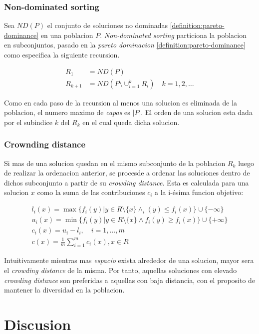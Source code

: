 
\subsubsection{Non-dominated sorting}\label{section:ndsorting}

Sea $ND(P)$ el conjunto de soluciones no dominadas \ref{definition:pareto-dominance} en una poblacion $P$. \emph{Non-dominated sorting} particiona la poblacion en subconjuntos, pasado en la \emph{pareto dominacion} \ref{definition:pareto-dominance} como especifica la siguiente recursion.

\begin{align}
    R_1 &= ND(P) \\
    R_{k+1} &= ND(P \setminus \cup_{i=1}^k R_i) \quad k = 1,2, \dots
\end{align}

Como en cada paso de la recursion al menos una solucion es eliminada de la poblacion, el numero maximo de \emph{capas} es $|P|$. El orden de una solucion esta dada por el subindice $k$ del $R_k$ en el cual queda dicha solucion.

\subsubsection{Crownding distance}\label{section:crowding-distance}

Si mas de una solucion quedan en el mismo subconjunto de la poblacion $R_k$ luego de realizar la ordenacion anterior, se procesde a ordenar las soluciones dentro de dichos subconjunto a partir de su \emph{crowding distance}. Esta es calculada para una solucion $x$ como la suma de las contribuciones $c_i$ a la i-\'esima funcion objetivo:

\begin{align}
    l_i(x) = \max \{ f_i(y) | y \in R \setminus \{x\} \wedge_i(y) \leq f_i(x) \} \cup \{-\infty\} \\
    u_i(x) = \min \{ f_i(y) | y \in R \setminus \{x\} \wedge f_i(y) \geq f_i(x) \} \cup \{+\infty\} \\
    c_i(x) = u_i - l_i, \quad i = 1, \dots, m \\
    c(x)   = \frac{1}{m} \sum_{i=1}^m c_i(x), x \in R
\end{align}

Intuitivamente mientras mas \textit{espacio} exista alrededor de una solucion, mayor sera el \emph{crowding distance} de la misma. Por tanto, aquellas soluciones con elevado \emph{crowding distance} son preferidas a aquellas con baja distancia, con el proposito de mantener la diversidad en la poblacion.

\section{Discusion}\label{discussion}
